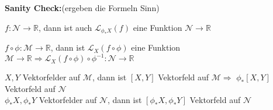 \documentclass[fleqn, 12pt, letterpaper]{article}
\begin{document}
\textbf{Sanity Check:}(ergeben die Formeln Sinn)

\(f: \mathcal{N} \to \mathbb{R}\), dann ist auch \(\mathcal{L}_{\phi_* X}(f)\) eine Funktion \(\mathcal{N} \to \mathbb{R}\)

\(f \circ \phi: \mathcal{M} \to \mathbb{R}\), dann ist \(\mathcal{L}_X(f \circ \phi)\) eine Funktion \(\mathcal{M} \to \mathbb{R} \Rightarrow \mathcal{L}_{X}(f \circ \phi) \circ \phi^{-1}: \mathcal{N} \to \mathbb{R}\)

\vspace{0.3cm}

\(X, Y\) Vektorfelder auf \(\mathcal{M}\), dann ist \([X, Y]\) Vektorfeld auf \(\mathcal{M} \Rightarrow\) $\phi_*[X,Y]$ Vektorfeld auf \(\mathcal{N}\)\\

\(\phi_* X, \phi_* Y\) Vektorfelder auf \(\mathcal{N}\), dann ist $[\phi_*X, \phi_*Y]$ Vektorfeld auf \(\mathcal{N}\)
\end{document}
